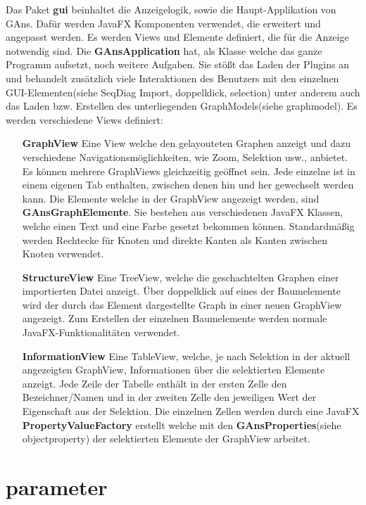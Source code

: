 Das Paket \textbf{gui} beinhaltet die Anzeigelogik, sowie die Haupt-Applikation von GAns. Dafür werden JavaFX Komponenten verwendet, die erweitert und angepasst werden. Es werden Views und Elemente definiert, die für die Anzeige notwendig sind. Die \textbf{GAnsApplication} hat, als Klasse welche das ganze Programm aufsetzt, noch weitere Aufgaben. Sie stößt das Laden der Plugins an und behandelt zusätzlich viele Interaktionen des Benutzers mit den einzelnen GUI-Elementen(siehe SeqDiag Import, doppelklick, selection) unter anderem auch das Laden bzw. Erstellen des unterliegenden GraphModels(siehe graphmodel). Es werden verschiedene Views definiert:
\begin{itemize}[labelindent=0pt,labelwidth=,itemindent=0em,leftmargin=!]
	\item[\textbf{GraphView}] Eine View welche den gelayouteten Graphen anzeigt und dazu verschiedene Navigationsmöglichkeiten, wie Zoom, Selektion usw., anbietet. Es können mehrere GraphViews gleichzeitig geöffnet sein. Jede einzelne ist in einem eigenen Tab enthalten, zwischen denen hin und her gewechselt werden kann. Die Elemente welche in der GraphView angezeigt werden, sind \textbf{GAnsGraphElemente}. Sie bestehen aus verschiedenen JavaFX Klassen, welche einen Text und eine Farbe gesetzt bekommen können. Standardmäßig werden Rechtecke für Knoten und direkte Kanten als Kanten zwischen Knoten verwendet.
	\item[\textbf{StructureView}] Eine TreeView, welche die geschachtelten Graphen einer importierten Datei anzeigt. Über doppelklick auf eines der Baumelemente wird der durch das Element dargestellte Graph in einer neuen GraphView angezeigt. Zum Erstellen der einzelnen Baumelemente werden normale JavaFX-Funktionalitäten verwendet.
	\item[\textbf{InformationView}] Eine TableView, welche, je nach Selektion in der aktuell angezeigten GraphView, Informationen über die selektierten Elemente anzeigt. Jede Zeile der Tabelle enthält in der ersten Zelle den Bezeichner/Namen und in der zweiten Zelle den jeweiligen Wert der Eigenschaft aus der Selektion. Die einzelnen Zellen werden durch eine JavaFX \textbf{PropertyValueFactory} erstellt welche mit den \textbf{GAnsProperties}(siehe objectproperty) der selektierten Elemente der GraphView arbeitet. 
\end{itemize}

\newpage

\section{parameter}

